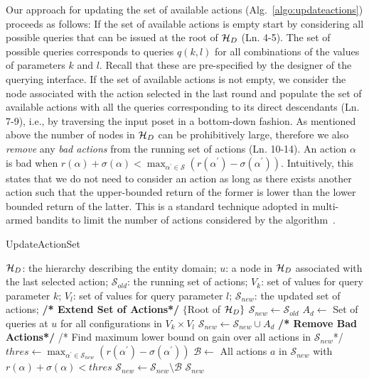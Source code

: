 Our approach for updating the set of available actions (Alg.~\ref{algo:updateactions}) proceeds as follows: If the set of available actions is empty start by considering all possible queries that can be issued at the root of $\mathcal{H}_D$ (Ln. 4-5). The set of possible queries corresponds to queries $q(k,l)$ for all combinations of the values of parameters $k$ and $l$. Recall that these are pre-specified by the designer of the querying interface. If the set of available actions is not empty, we consider the node associated with the action selected in the last round and populate the set of available actions with all the queries corresponding to its direct descendants (Ln. 7-9), i.e., by traversing the input poset in a bottom-down fashion. As mentioned above the number of nodes in $\mathcal{H}_D$ can be prohibitively large, therefore we also {\em remove} any {\em bad actions} from the running set of actions (Ln.  10-14). 
An action $\alpha$ is bad when $r(\alpha) + \sigma(\alpha) < \max_{\alpha^{\prime} \in \mathcal{S}} (r(\alpha^{\prime}) - \sigma(\alpha^{\prime}))$. Intuitively, this states that we do not need to consider an action as long as there exists another action such that the upper-bounded return of the former is lower than the lower bounded return of the latter. This is a standard technique adopted in multi-armed bandits to limit the number of actions considered by the algorithm~\cite{EvenDar06actionelimination}. 


\begin{algorithm}[h]
\small\caption{UpdateActionSet}
\label{algo:updateactions}
\begin{algorithmic}[1]
 $\mathcal{H}_D$: the hierarchy describing the entity domain; $u$: a node in $\mathcal{H}_D$ associated with the last selected action; $\mathcal{S}_{old}$: the running set of actions; $V_k$: set of values for query parameter $k$; $V_l$: set of values for query parameter $l$;
 $\mathcal{S}_{new}$: the updated set of actions;
\STATE \textbf{/* Extend Set of Actions*/}
	\RETURN $\{$Root of $\mathcal{H}_D \}$
\ENDIF 
\STATE $\mathcal{S}_{new} \leftarrow \mathcal{S}_{old}$
\STATE $A_d \leftarrow$ Set of queries at $u$ for all configurations in $V_k \times V_l$
\STATE $\mathcal{S}_{new} \leftarrow \mathcal{S}_{new} \cup A_d$
\ENDFOR
\STATE \textbf{/* Remove Bad Actions*/}
\STATE /* Find maximum lower bound on gain over all actions in $\mathcal{S}_{new}$*/
\STATE $thres \leftarrow \max_{\alpha^{\prime} \in \mathcal{S}_{new}} (r(\alpha^{\prime}) - \sigma(\alpha^{\prime}))$  
\STATE $\mathcal{B} \leftarrow$ All actions $a$ in $\mathcal{S}_{new}$ with $r(\alpha) + \sigma(\alpha) < thres$
\STATE $\mathcal{S}_{new} \leftarrow \mathcal{S}_{new} \setminus \mathcal{B}$
\RETURN $\mathcal{S}_{new}$
\end{algorithmic}
\end{algorithm}
\vspace{-5pt}
